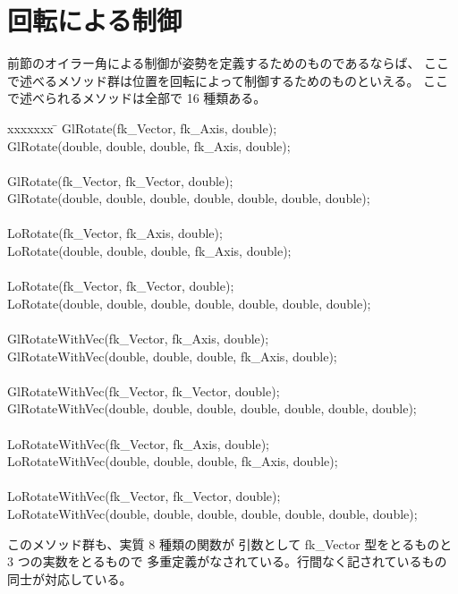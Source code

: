 \section{回転による制御}
前節のオイラー角による制御が姿勢を定義するためのものであるならば、
ここで述べるメソッド群は位置を回転によって制御するためのものといえる。
ここで述べられるメソッドは全部で 16 種類ある。
\begin{bf}
\begin{tabbing}
xxxxxxx \= \kill
\> GlRotate(fk\_Vector, fk\_Axis, double); \\
\> GlRotate(double, double, double, fk\_Axis, double); \\
\\
\> GlRotate(fk\_Vector, fk\_Vector, double); \\
\> GlRotate(double, double, double, double, double, double, double); \\
\\
\> LoRotate(fk\_Vector, fk\_Axis, double); \\
\> LoRotate(double, double, double, fk\_Axis, double); \\
\\
\> LoRotate(fk\_Vector, fk\_Vector, double); \\
\> LoRotate(double, double, double, double, double, double, double); \\
\\
\> GlRotateWithVec(fk\_Vector, fk\_Axis, double); \\
\> GlRotateWithVec(double, double, double, fk\_Axis, double); \\
\\
\> GlRotateWithVec(fk\_Vector, fk\_Vector, double); \\
\> GlRotateWithVec(double, double, double, double, double, double, double); \\
\\
\> LoRotateWithVec(fk\_Vector, fk\_Axis, double); \\
\> LoRotateWithVec(double, double, double, fk\_Axis, double); \\
\\
\> LoRotateWithVec(fk\_Vector, fk\_Vector, double); \\
\> LoRotateWithVec(double, double, double, double, double, double, double); \\
\end{tabbing}
\end{bf}
このメソッド群も、実質 8 種類の関数が
引数として fk\_Vector 型をとるものと 3 つの実数をとるもので
多重定義がなされている。行間なく記されているもの同士が対応している。

